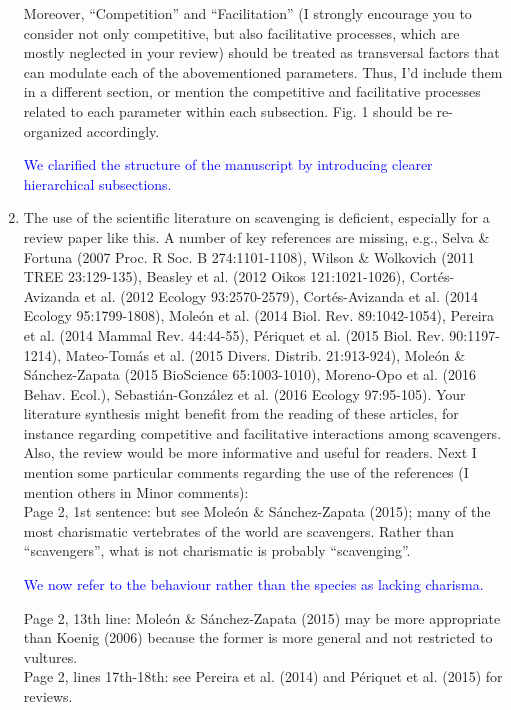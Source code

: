 \documentclass[12pt,letterpaper]{article}
\begin{document}
\begin{enumerate}
{Moreover, ``Competition'' and ``Facilitation'' (I strongly encourage you to consider not only competitive, but also facilitative processes, which are mostly neglected in your review) should be treated as transversal factors that can modulate each of the abovementioned parameters. Thus, I'd include them in a different section, or mention the competitive and facilitative processes related to each parameter within each subsection. Fig. 1 should be re-organized accordingly.}

\textcolor{blue}{We clarified the structure of the manuscript by introducing clearer hierarchical subsections.}

\item{The use of the scientific literature on scavenging is deficient, especially for a review paper like this. A number of key references are missing, e.g., Selva \& Fortuna (2007 Proc. R Soc. B 274:1101-1108), Wilson \& Wolkovich (2011 TREE 23:129-135), Beasley et al. (2012 Oikos 121:1021-1026), Cort\'{e}s-Avizanda et al. (2012 Ecology 93:2570-2579), Cort\'{e}s-Avizanda et al. (2014 Ecology 95:1799-1808), Mole\'{o}n et al. (2014 Biol. Rev. 89:1042-1054), Pereira et al. (2014 Mammal Rev. 44:44-55), P\'{e}riquet et al. (2015 Biol. Rev. 90:1197-1214), Mateo-Tom\'{a}s et al. (2015 Divers. Distrib. 21:913-924), Mole\'{o}n \& S\'{a}nchez-Zapata (2015 BioScience 65:1003-1010), Moreno-Opo et al. (2016 Behav. Ecol.), Sebasti\'{a}n-Gonz\'{a}lez et al. (2016 Ecology 97:95-105). Your literature synthesis might benefit from the reading of these articles, for instance regarding competitive and facilitative interactions among scavengers. Also, the review would be more informative and useful for readers. Next I mention some particular comments regarding the use of the references (I mention others in Minor comments):}\\

Page 2, 1st sentence: but see Mole\'{o}n \& S\'{a}nchez-Zapata (2015); many of the most charismatic vertebrates of the world are scavengers. Rather than ``scavengers'', what is not charismatic is probably ``scavenging''.

\textcolor{blue}{We now refer to the behaviour rather than the species as lacking charisma.}

 Page 2, 13th line: Mole\'{o}n \& S\'{a}nchez-Zapata (2015) may be more appropriate than Koenig (2006) because the former is more general and not restricted to vultures.\\
 Page 2, lines 17th-18th: see Pereira et al. (2014) and P\'{e}riquet et al. (2015) for reviews.


\end{enumerate}
\end{document}
